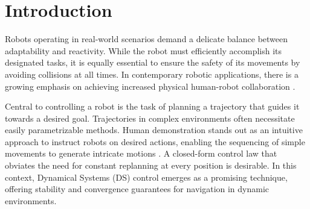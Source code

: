 \section{Introduction}
Robots operating in real-world scenarios demand a delicate balance between adaptability and reactivity. While the robot must efficiently accomplish its designated tasks, it is equally essential to ensure the safety of its movements by avoiding collisions at all times. In contemporary robotic applications, there is a growing emphasis on achieving increased physical human-robot collaboration \cite{ajoudani2018progress}.

Central to controlling a robot is the task of planning a trajectory that guides it towards a desired goal. Trajectories in complex environments often necessitate easily parametrizable methods. Human demonstration stands out as an intuitive approach to instruct robots on desired actions, enabling the sequencing of simple movements to generate intricate motions \cite{gribovskaya2011motion}. 
A closed-form control law that obviates the need for constant replanning at every position is desirable. In this context, Dynamical Systems (DS) control emerges as a promising technique, offering stability and convergence guarantees for navigation in dynamic environments.


